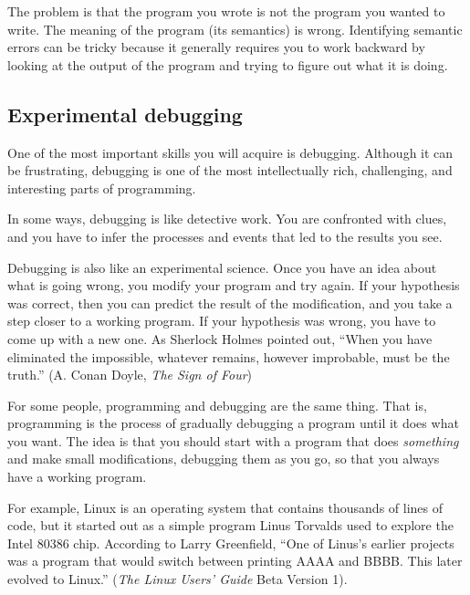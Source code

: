 \documentclass[10pt]{book}
\begin{document}
The problem is that the program you wrote is not the program you wanted to write.  The meaning of the program (its semantics) is wrong. Identifying semantic errors can be tricky because it generally requires you to work backward by looking at the output of the program and trying to figure out what it is doing.

\subsection{Experimental debugging}

One of the most important skills you will acquire is debugging. Although it can be frustrating, debugging is one of the most intellectually rich, challenging, and interesting parts of programming.


In some ways, debugging is like detective work.  You are confronted with clues, and you have to infer the processes and events that led to the results you see.

Debugging is also like an experimental science.  Once you have an idea about what is going wrong, you modify your program and try again.  If your hypothesis was correct, then you can predict the result of the modification, and you take a step closer to a working program.  If your hypothesis was wrong, you have to come up with a new one.  As Sherlock Holmes pointed out, ``When you have eliminated the impossible, whatever remains, however improbable, must be the truth.'' (A. Conan Doyle, {\em The Sign of Four})


For some people, programming and debugging are the same thing.  That is, programming is the process of gradually debugging a program until it does what you want.  The idea is that you should start with a program that does {\em something} and make small modifications, debugging them as you go, so that you always have a working program.

For example, Linux is an operating system that contains thousands of lines of code, but it started out as a simple program Linus Torvalds used to explore the Intel 80386 chip.  According to Larry Greenfield, ``One of Linus's earlier projects was a program that would switch between printing AAAA and BBBB.  This later evolved to Linux.'' 
({\em The Linux Users' Guide} Beta Version 1).

\end{document}
